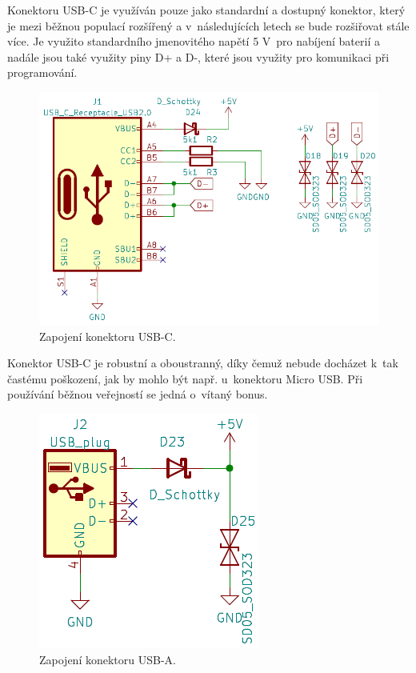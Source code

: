 Konektoru USB-C je využíván pouze jako standardní a dostupný konektor, který je mezi běžnou
populací rozšířený a v~následujících letech se bude rozšiřovat stále více. Je využito standardního jmenovitého napětí 5 V~pro nabíjení baterií a nadále jsou také využity 
piny D+ a D-, které jsou využity pro komunikaci při programování. 

\begin{figure}[!h]
  \begin{center}
    \includegraphics[scale=0.5]{obrazky/USB_C.png}
  \end{center}
  \caption[Zapojení konektoru USB-C]{Zapojení konektoru USB-C.}
\end{figure}

Konektor USB-C je robustní a oboustranný, díky čemuž nebude docházet k~tak častému poškození, jak by mohlo být např. u~konektoru Micro USB. Při používání běžnou veřejností
se jedná o~vítaný bonus. 

\begin{figure}[!h]
  \begin{center}
    \includegraphics[scale=0.6]{obrazky/USB_A.png}
  \end{center}
  \caption[Zapojení konektoru USB-A]{Zapojení konektoru USB-A.}
\end{figure}

